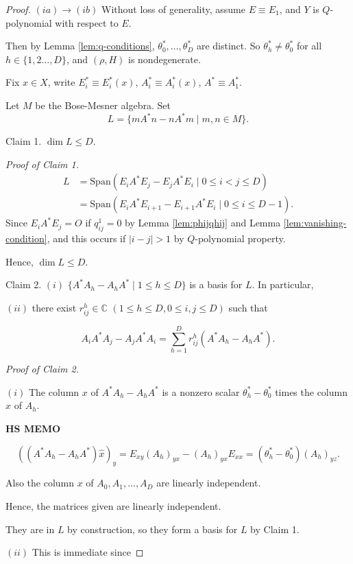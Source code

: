 \documentclass[
]{book}
\theoremstyle{definition}
\theoremstyle{definition}
\theoremstyle{definition}
\theoremstyle{definition}
\theoremstyle{remark}
\begin{document}
\begin{proof}
\leavevmode

\((ia)\to(ib)\) Without loss of generality, assume \(E \equiv E_1\), and \(Y\) is \(Q\)-polynomial with respect to \(E\).

Then by Lemma \ref{lem:q-conditions},
\(\theta_0^*, \ldots, \theta^*_D\) are distinct. So \(\theta^*_h\neq \theta^*_0\) for all \(h\in \{1,2\ldots, D\}\), and \((\rho, H)\) is nondegenerate.

Fix \(x\in X\), write \(E^*_i\equiv E^*_i(x)\), \(A^*_i \equiv A^*_i(x)\), \(A^* \equiv A_1^*\).

Let \(M\) be the Bose-Mesner algebra. Set
\[L = \{mA^*n - nA^*m\mid m, n\in M\}.\]

Claim 1. \(\dim L \leq D\).

\emph{Proof of Claim 1.}
\begin{align}
L & = \mathrm{Span}(E_iA^*E_j - E_jA^*E_i \mid 0\leq i<j\leq D)\\
& = \mathrm{Span}(E_iA^*E_{i+1} - E_{i+1}A^*E_i \mid 0\leq i\leq D-1).
\end{align}
Since \(E_iA^*E_j = O\) if \(q^1_{ij} = 0\) by Lemma \ref{lem:phijqhij} and Lemma \ref{lem:vanishing-condition},
and this occurs if \(|i-j|>1\) by \(Q\)-polynomial property.

Hence, \(\dim L \leq D\).

Claim 2. \((i)\) \(\{A^*A_h - A_hA^*\mid 1\leq h\leq D\}\) is a basis for \(L\). In particular,

\((ii)\) there exist \(r^h_{ij}\in \mathbb{C}\) \((1\leq h\leq D, 0\leq i,j\leq D)\) such that

\[A_iA^*A_j - A_jA^*A_i = \sum_{h=1}^D r^h_{ij}(A^*A_h - A_hA^*).\]

\emph{Proof of Claim 2.}

\((i)\) The column \(x\) of \(A^*A_h - A_hA^*\) is a nonzero scalar \(\theta^*_h - \theta^*_0\) times the column \(x\) of \(A_h\).

\textbf{HS MEMO}

\[ ((A^*A_h - A_hA^*)\hat{x})_y = E_{xy}(A_h)_{yx}- (A_h)_{yx}E_{xx} = (\theta^*_h-\theta^*_0)(A_h)_{yz}.\]

Also the column \(x\) of \(A_0, A_1, \ldots, A_D\) are linearly independent.

Hence, the matrices given are linearly independent.

They are in \(L\) by construction, so they form a basis for \(L\) by Claim 1.

\((ii)\) This is immediate since


\end{proof}
\end{document}
